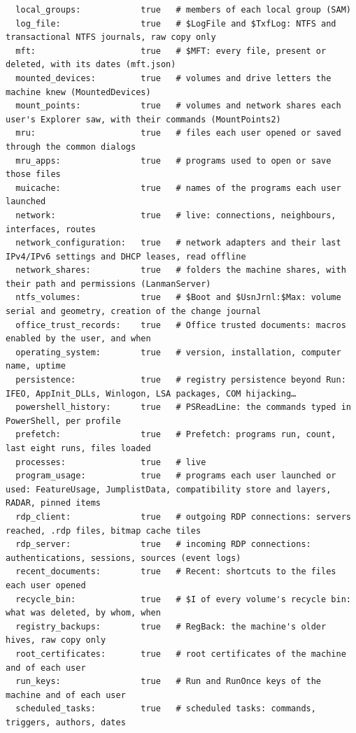 \documentclass[11pt,a4paper,oneside]{report}
\begin{document}
\begin{lstlisting}
  local_groups:            true   # members of each local group (SAM)
  log_file:                true   # $LogFile and $TxfLog: NTFS and transactional NTFS journals, raw copy only
  mft:                     true   # $MFT: every file, present or deleted, with its dates (mft.json)
  mounted_devices:         true   # volumes and drive letters the machine knew (MountedDevices)
  mount_points:            true   # volumes and network shares each user's Explorer saw, with their commands (MountPoints2)
  mru:                     true   # files each user opened or saved through the common dialogs
  mru_apps:                true   # programs used to open or save those files
  muicache:                true   # names of the programs each user launched
  network:                 true   # live: connections, neighbours, interfaces, routes
  network_configuration:   true   # network adapters and their last IPv4/IPv6 settings and DHCP leases, read offline
  network_shares:          true   # folders the machine shares, with their path and permissions (LanmanServer)
  ntfs_volumes:            true   # $Boot and $UsnJrnl:$Max: volume serial and geometry, creation of the change journal
  office_trust_records:    true   # Office trusted documents: macros enabled by the user, and when
  operating_system:        true   # version, installation, computer name, uptime
  persistence:             true   # registry persistence beyond Run: IFEO, AppInit_DLLs, Winlogon, LSA packages, COM hijacking…
  powershell_history:      true   # PSReadLine: the commands typed in PowerShell, per profile
  prefetch:                true   # Prefetch: programs run, count, last eight runs, files loaded
  processes:               true   # live
  program_usage:           true   # programs each user launched or used: FeatureUsage, JumplistData, compatibility store and layers, RADAR, pinned items
  rdp_client:              true   # outgoing RDP connections: servers reached, .rdp files, bitmap cache tiles
  rdp_server:              true   # incoming RDP connections: authentications, sessions, sources (event logs)
  recent_documents:        true   # Recent: shortcuts to the files each user opened
  recycle_bin:             true   # $I of every volume's recycle bin: what was deleted, by whom, when
  registry_backups:        true   # RegBack: the machine's older hives, raw copy only
  root_certificates:       true   # root certificates of the machine and of each user
  run_keys:                true   # Run and RunOnce keys of the machine and of each user
  scheduled_tasks:         true   # scheduled tasks: commands, triggers, authors, dates

\end{lstlisting}
\end{document}

